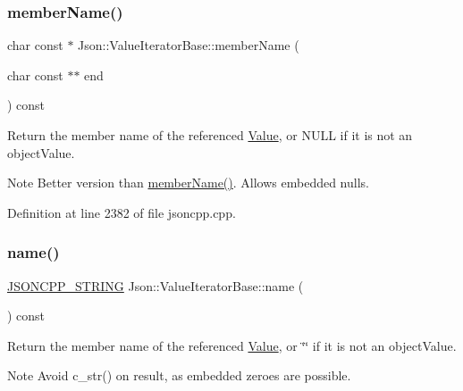 \subsubsection{\texorpdfstring{member\+Name()}{memberName()}\hspace{0.1cm}{\footnotesize\ttfamily [4/4]}}
{\footnotesize\ttfamily char const  $\ast$ Json\+::\+Value\+Iterator\+Base\+::member\+Name (\begin{DoxyParamCaption}\item[{char const $\ast$$\ast$}]{end }\end{DoxyParamCaption}) const}

Return the member name of the referenced \hyperlink{class_json_1_1_value}{Value}, or N\+U\+LL if it is not an object\+Value. \begin{DoxyNote}{Note}
Better version than \hyperlink{class_json_1_1_value_iterator_base_a54765da6759fd3f1edcbfbaf308ec263}{member\+Name()}. Allows embedded nulls. 
\end{DoxyNote}


Definition at line 2382 of file jsoncpp.\+cpp.

\hypertarget{class_json_1_1_value_iterator_base_a522989403c976fdbb94da846b99418db}{}\label{class_json_1_1_value_iterator_base_a522989403c976fdbb94da846b99418db} 
\subsubsection{\texorpdfstring{name()}{name()}\hspace{0.1cm}{\footnotesize\ttfamily [1/2]}}
{\footnotesize\ttfamily \hyperlink{config_8h_a1e723f95759de062585bc4a8fd3fa4be}{J\+S\+O\+N\+C\+P\+P\+\_\+\+S\+T\+R\+I\+NG} Json\+::\+Value\+Iterator\+Base\+::name (\begin{DoxyParamCaption}{ }\end{DoxyParamCaption}) const}

Return the member name of the referenced \hyperlink{class_json_1_1_value}{Value}, or \char`\"{}\char`\"{} if it is not an object\+Value. \begin{DoxyNote}{Note}
Avoid {\ttfamily c\+\_\+str()} on result, as embedded zeroes are possible. 
\end{DoxyNote}
\hypertarget{class_json_1_1_value_iterator_base_a522989403c976fdbb94da846b99418db}{}\label{class_json_1_1_value_iterator_base_a522989403c976fdbb94da846b99418db} 
